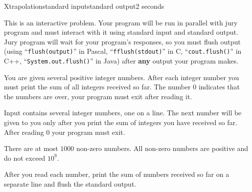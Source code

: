 \begin{problem}{Xtrapolation}{standard input}{standard output}{2 seconds}

This is an interactive problem. Your program will be run in parallel with 
jury program and must interact with it using standard input and standard
output. Jury program will wait for your program's responses, so you
must flush output (using ``\verb|flush(output)|'' in Pascal, ``\verb|fflush(stdout)|''
in C, ``\verb|cout.flush()|'' in C++, ``\verb|System.out.flush()|'' in Java) after
\textbf{any} output your program makes.

You are given several positive integer numbers. After each integer number you must
print the sum of all integers received so far. The number $0$ indicates that the 
numbers are over, your program must exit after reading it.

\InputFile

Input contains several integer numbers, one on a line. The
next number will be given to you only after you print the sum of
integers you have received so far. After reading 0 your program must exit.

There are at most $1000$ non-zero numbers. All non-zero numbers are positive
and do not exceed $10^9$.

\OutputFile

After you read each number, print the sum of numbers received so far on a 
separate line and flush the standard output.

\Example

\begin{example}
%
\end{example}

\end{problem}
